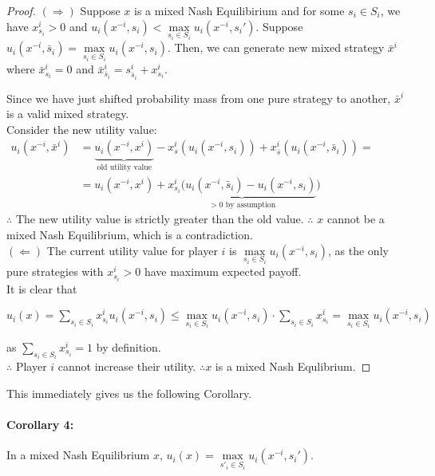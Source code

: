 \documentclass[12pt]{article}
\begin{document}
\begin{proof}
$(\Rightarrow)$ Suppose $x$ is a mixed Nash Equilibirium and for some $s_i \in S_i$, we have $x^i_{s_i} > 0$ and $u_i(x^{-i},s_i) < \max\limits_{s_i \in S_i} u_i(x^{-i},s_i')$. Suppose $u_i(x^{-i},\bar{s}_i) = \max\limits_{s_i \in S_i} u_i(x^{-i},s_i)$. Then, we can generate new mixed strategy $\bar{x}^i$ where $\bar{x}^i_{s_i} = 0$ and $\bar{x}^i_{\bar{s}_i} = s^i_{\bar{s}_i} + x^i_{s_i}$.

Since we have just shifted probability mass from one pure strategy to another, $\bar{x}^i$ is a valid mixed strategy.\\

Consider the new utility value:\\
$\begin{array}{rl}
u_i(x^{-i},\bar{x}^i) & = \underbrace{u_i(x^{-i},x^i)}_{\text{old utility value}} - x^i_s( u_i(x^{-i},s_i)) + x^i_{\bar{s}}(u_i(x^{-i},\bar{s}_i)) = \\
& = u_i(x^{-i},x^i)+ \underbrace{x^i_{s_i}(u_i(x^{-i},\bar{s}_i) - u_i(x^{-i},s_i)}_{> 0 \text{ by assumption}})
\end{array}$\\

$\therefore$ The new utility value is strictly greater than the old value. $\therefore$ $x$ cannot be a mixed Nash Equilibrium, which is a contradiction.\\

$(\Leftarrow)$ The current utility value for player $i$ is $\max\limits_{s_i \in S_i} u_i(x^{-i}, s_i)$, as the only pure strategies with $x^i_{s_i} > 0$ have maximum expected payoff.\\

It is clear that
\begin{center} $u_i(x) = \sum\limits_{s_i \in S_i} x^i_{s_i} u_i(x^{-i},s_i) \leq \max\limits_{s_i \in S_i} u_i(x^{-i},s_i) 
\cdot \sum\limits_{s_i \in S_i } x^i_{s_i} = \max\limits_{s_i \in S_i} u_i(x^{-i},s_i)$

\end{center} as $\sum\limits_{s_i \in S_i } x^i_{s_i} = 1$ by definition.\\

$\therefore$ Player $i$ cannot increase their utility. $\therefore x$ is a mixed Nash Equlibrium.
\end{proof}

This immediately gives us the following Corollary.
\paragraph{Corollary 4:} In a mixed Nash Equilibrium $x$, $u_i(x) = \max\limits_{s'_i \in S_i} u_i(x^{-i}, s_i')$.
\end{document}
